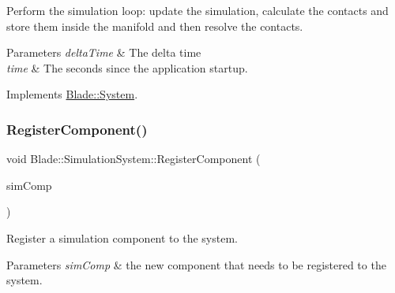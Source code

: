 Perform the simulation loop\+: update the simulation, calculate the contacts and store them inside the manifold and then resolve the contacts. 


\begin{DoxyParams}{Parameters}
{\em delta\+Time} & The delta time \\
\hline
{\em time} & The seconds since the application startup. \\
\hline
\end{DoxyParams}


Implements \hyperlink{class_blade_1_1_system_a80c186f5f9f8fa4fd317b861853fe6a8}{Blade\+::\+System}.

\mbox{\label{class_blade_1_1_simulation_system_a638c4b8971944ab94cfda2c59a651665}} 
\subsubsection{\texorpdfstring{Register\+Component()}{RegisterComponent()}\hspace{0.1cm}{\footnotesize\ttfamily [1/2]}}
{\footnotesize\ttfamily void Blade\+::\+Simulation\+System\+::\+Register\+Component (\begin{DoxyParamCaption}\item[{\hyperlink{class_blade_1_1_simulation_component}{Simulation\+Component} $\ast$}]{sim\+Comp }\end{DoxyParamCaption})\hspace{0.3cm}{\ttfamily [noexcept]}}



Register a simulation component to the system. 


\begin{DoxyParams}{Parameters}
{\em sim\+Comp} & the new component that needs to be registered to the system. \\
\hline
\end{DoxyParams}
\mbox{\label{class_blade_1_1_simulation_system_ad1a98c60a727feba8899e57cacfbab70}} 
